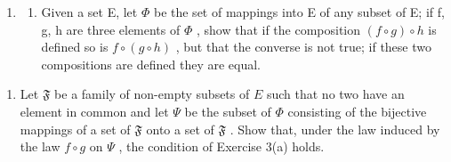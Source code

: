 \begin{enumerate}
\def\labelenumi{\arabic{enumi}.}
\setcounter{enumi}{3}
\tightlist
\item
  \begin{enumerate}
  \def\labelenumii{(\alph{enumii})}
  \tightlist
  \item
    Given a set E, let \(\Phi\) be the set of mappings into E of any subset of E; if f, g, h are three elements of \(\Phi\) , show that if the composition \((f \circ g) \circ h\) is defined so is \(f \circ (g \circ h)\) , but that the converse is not true; if these two compositions are defined they are equal.
  \end{enumerate}
\end{enumerate}

\begin{enumerate}
\def\labelenumi{(\alph{enumi})}
\setcounter{enumi}{1}
\tightlist
\item
  Let \(\mathfrak{F}\) be a family of non-empty subsets of \(E\) such that no two have an element in common and let \(\Psi\) be the subset of \(\Phi\) consisting of the bijective mappings of a set of \(\mathfrak{F}\) onto a set of \(\mathfrak{F}\) . Show that, under the law induced by the law \(f \circ g\) on \(\Psi\) , the condition of Exercise 3(a) holds.
\end{enumerate}

